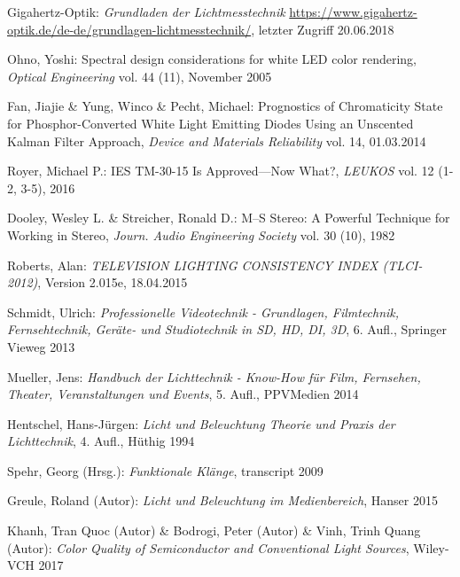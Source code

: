 \begin{thebibliography}{}
Gigahertz-Optik:
\emph{\glqq Grundladen der Lichtmesstechnik\grqq}
\url{https://www.gigahertz-optik.de/de-de/grundlagen-lichtmesstechnik/}, letzter Zugriff 20.06.2018


Ohno, Yoshi:
\glqq Spectral design considerations for white LED color rendering\grqq, 
\emph{Optical Engineering} vol. 44 (11), November 2005


Fan, Jiajie \& Yung, Winco \& Pecht, Michael:
\glqq Prognostics of Chromaticity State for Phosphor-Converted White Light Emitting Diodes Using an Unscented Kalman Filter Approach\grqq, 
\emph{Device and Materials Reliability} vol. 14, 01.03.2014

Royer, Michael P.:
\glqq IES TM-30-15 Is Approved—Now What?\grqq, 
\emph{LEUKOS} vol. 12 (1-2, 3-5), 2016


Dooley, Wesley L.  \& Streicher, Ronald D.:
\glqq M--S Stereo: A Powerful Technique for Working in Stereo\grqq, 
\emph{Journ. Audio Engineering Society} vol. 30 (10), 1982

Roberts, Alan: 
\emph{TELEVISION LIGHTING CONSISTENCY INDEX (TLCI-2012)}, Version 2.015e, 18.04.2015

Schmidt, Ulrich: 
\emph{Professionelle Videotechnik - Grundlagen, Filmtechnik, Fernsehtechnik, Geräte- und Studiotechnik in SD, HD, DI, 3D}, 6. Aufl., Springer Vieweg 2013

Mueller, Jens: 
\emph{Handbuch der Lichttechnik - Know-How für Film, Fernsehen, Theater, Veranstaltungen und Events}, 5. Aufl., PPVMedien 2014
 
Hentschel, Hans-Jürgen: 
\emph{Licht und Beleuchtung Theorie und Praxis der Lichttechnik}, 4. Aufl., Hüthig 1994

Spehr, Georg (Hrsg.): 
\emph{Funktionale Klänge}, transcript 2009

Greule, Roland (Autor):
\emph{Licht und Beleuchtung im Medienbereich}, Hanser 2015 

Khanh, Tran Quoc (Autor) \& Bodrogi, Peter (Autor) \& Vinh, Trinh Quang (Autor):
\emph{Color Quality of Semiconductor and Conventional Light Sources}, Wiley-VCH 2017



\end{thebibliography}
